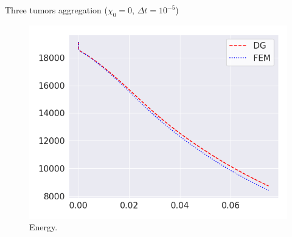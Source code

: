 \begin{frame}{Three tumors aggregation ($\chi_0=0$, $\Delta t=10^{-5}$)}
	\begin{figure}
		\centering
		\includegraphics[scale=0.45]{img/three_tumors/tumor_energy_chi-0.png}
		\caption{Energy.}
	\end{figure}
\end{frame}

